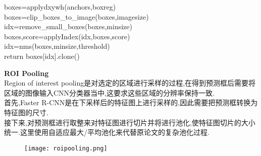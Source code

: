 \begin{frame}
    \qquad\textcolor{vscodeparameter}{boxes}=\textcolor{vscodefuncation}{applydxywh}\textcolor{vscodebracket}{(}\textcolor{vscodeparameter}{anchors},\textcolor{vscodeparameter}{boxreg}\textcolor{vscodebracket}{)}\\

    \qquad\textcolor{vscodeparameter}{boxes}=\textcolor{vscodefuncation}{clip\_boxes\_to\_image}\textcolor{vscodebracket}{(}\textcolor{vscodeparameter}{boxes},\textcolor{vscodeparameter}{imagesize}\textcolor{vscodebracket}{)}\\

    \qquad\textcolor{vscodeparameter}{idx}=\textcolor{vscodefuncation}{remove\_small\_boxes}\textcolor{vscodebracket}{(}\textcolor{vscodeparameter}{boxes},\textcolor{vscodeparameter}{minsize}\textcolor{vscodebracket}{)}\\

    \qquad\textcolor{vscodeparameter}{boxes},\textcolor{vscodeparameter}{score}=\textcolor{vscodefuncation}{applyIndex}\textcolor{vscodebracket}{(}\textcolor{vscodeparameter}{idx},\textcolor{vscodeparameter}{boxes},\textcolor{vscodeparameter}{score}\textcolor{vscodebracket}{)}\\

    \qquad\textcolor{vscodeparameter}{idx}=\textcolor{vscodefuncation}{nms}\textcolor{vscodebracket}{(}\textcolor{vscodeparameter}{boxes},\textcolor{vscodeparameter}{minsize},\textcolor{vscodeparameter}{threshold}\textcolor{vscodebracket}{)}\\

    \qquad\textcolor{vscodereturn}{return} \textcolor{vscodeparameter}{boxes}\textcolor{vscodebracket}{[}\textcolor{vscodeparameter}{idx}\textcolor{vscodebracket}{]}.\textcolor{vscodefuncation}{clone}\textcolor{vscodebracket}{(}\textcolor{vscodebracket}{)}
\end{frame}

\begin{frame}
    \vspace{0.5em}
    \noindent\large\textbf{ROI Pooling}\\
    \vspace{0.5em}
    Region of interest pooling是对选定的区域进行采样的过程,在得到预测框后需要将区域的图像输入CNN分类器当中,这要求这些区域的分辨率保持一致.\\
    \vspace{0.2em}
    首先,Faster R-CNN是在下采样后的特征图上进行采样的,因此需要把预测框转换为特征图的尺寸.\\
    \vspace{0.2em}
    接下来,对预测框进行取整来对特征图进行切片并将进行池化,使特征图切片的大小统一.这里使用自适应最大/平均池化来代替原论文的复杂池化过程.
    \begin{figure}
        \texttt{[image: roipooling.png]}
    \end{figure}
\end{frame}


